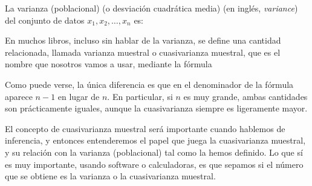 La {\sf varianza (poblacional)} (o {\sf desviación cuadrática media}) (en ingl\'es, {\em variance})
del conjunto de datos $x_1,x_2,\ldots,x_n$ es:
        \begin{center}
        \end{center}
En muchos libros, incluso sin hablar de la varianza, se define una
cantidad relacionada, llamada {\sf varianza muestral} 
o {\sf cuasivarianza muestral}, que es el nombre que nosotros vamos a usar,
 mediante la fórmula
        \begin{center}
        \end{center}
Como puede verse, la única diferencia es que en el denominador de la fórmula
aparece $n-1$ en lugar de $n$. En particular, si $n$ es muy grande, ambas
cantidades son prácticamente iguales, aunque la cuasivarianza siempre es
ligeramente mayor.

El concepto de cuasivarianza muestral será importante cuando hablemos de
inferencia, y entonces entenderemos el papel que juega la cuasivarianza
muestral, y su relación con la varianza (poblacional) tal como la hemos
definido. Lo que sí es {\sf\large muy importante}, usando software o
calculadoras, es que sepamos si el número que se obtiene es la varianza o la
cuasivarianza muestral.

